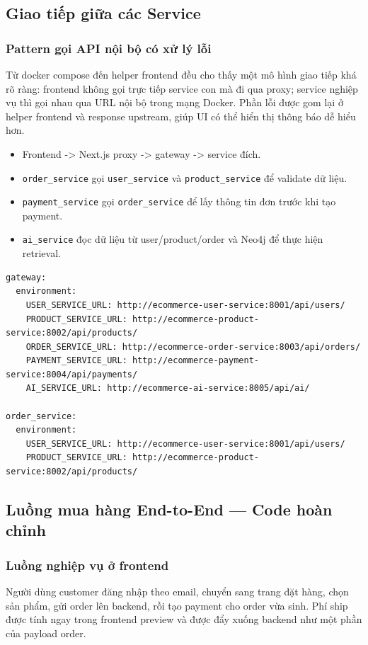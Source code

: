 \documentclass[12pt,a4paper]{article}
\begin{document}
\subsection{Giao tiếp giữa các Service}
\subsubsection{Pattern gọi API nội bộ có xử lý lỗi}
Từ docker compose đến helper frontend đều cho thấy một mô hình giao tiếp khá rõ ràng: frontend không gọi trực tiếp service con mà đi qua proxy; service nghiệp vụ thì gọi nhau qua URL nội bộ trong mạng Docker. Phần lỗi được gom lại ở helper frontend và response upstream, giúp UI có thể hiển thị thông báo dễ hiểu hơn.

\begin{itemize}
  \item Frontend -> Next.js proxy -> gateway -> service đích.
  \item \texttt{order\_service} gọi \texttt{user\_service} và \texttt{product\_service} để validate dữ liệu.
  \item \texttt{payment\_service} gọi \texttt{order\_service} để lấy thông tin đơn trước khi tạo payment.
  \item \texttt{ai\_service} đọc dữ liệu từ user/product/order và Neo4j để thực hiện retrieval.
\end{itemize}

\begin{lstlisting}[style=code,caption={Định tuyến nội bộ giữa các service trong docker compose}]
gateway:
  environment:
    USER_SERVICE_URL: http://ecommerce-user-service:8001/api/users/
    PRODUCT_SERVICE_URL: http://ecommerce-product-service:8002/api/products/
    ORDER_SERVICE_URL: http://ecommerce-order-service:8003/api/orders/
    PAYMENT_SERVICE_URL: http://ecommerce-payment-service:8004/api/payments/
    AI_SERVICE_URL: http://ecommerce-ai-service:8005/api/ai/

order_service:
  environment:
    USER_SERVICE_URL: http://ecommerce-user-service:8001/api/users/
    PRODUCT_SERVICE_URL: http://ecommerce-product-service:8002/api/products/
\end{lstlisting}

\subsection{Luồng mua hàng End-to-End --- Code hoàn chỉnh}
\subsubsection{Luồng nghiệp vụ ở frontend}
Người dùng customer đăng nhập theo email, chuyển sang trang đặt hàng, chọn sản phẩm, gửi order lên backend, rồi tạo payment cho order vừa sinh. Phí ship được tính ngay trong frontend preview và được đẩy xuống backend như một phần của payload order.
\end{document}
